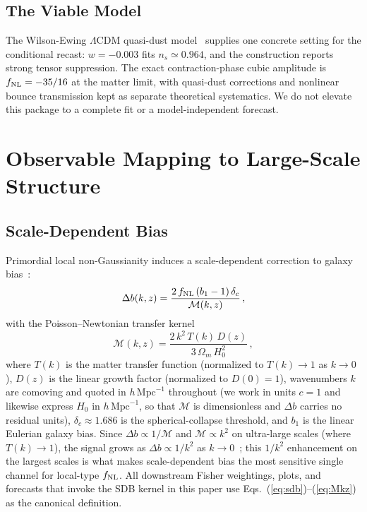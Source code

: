 \documentclass[aps,prd,twocolumn,superscriptaddress,showpacs,preprintnumbers,nofootinbib,longbibliography,floatfix]{revtex4-2}
\newcommand{\fnl}{f_{\rm NL}}
\begin{document}
\subsection{The Viable Model}

The Wilson-Ewing $\Lambda$CDM quasi-dust model~\cite{WilsonEwing:2012} supplies one concrete setting for the conditional recast: $w=-0.003$ fits $n_s\simeq0.964$, and the construction reports strong tensor suppression. The exact contraction-phase cubic amplitude is $\fnl=-35/16$ at the matter limit, with quasi-dust corrections and nonlinear bounce transmission kept as separate theoretical systematics. We do not elevate this package to a complete fit or a model-independent forecast.

\section{Observable Mapping to Large-Scale Structure}
\label{sec:lss}

\subsection{Scale-Dependent Bias}

Primordial local non-Gaussianity induces a scale-dependent correction to galaxy bias~\cite{Dalal:2007cu,Slosar:2008}:
\begin{equation}
\Delta b(k,z) = \frac{2\,\fnl\,(b_1 - 1)\,\delta_c}{\mathcal{M}(k,z)}\,,
\label{eq:sdb}
\end{equation}
with the Poisson--Newtonian transfer kernel
\begin{equation}
\mathcal{M}(k,z) = \frac{2\,k^2\,T(k)\,D(z)}{3\,\Omega_m\,H_0^2}\,,
\label{eq:Mkz}
\end{equation}
where $T(k)$ is the matter transfer function (normalized to $T(k)\to 1$ as $k\to 0$), $D(z)$ is the linear growth factor (normalized to $D(0)=1$), wavenumbers $k$ are comoving and quoted in $h\,\mathrm{Mpc}^{-1}$ throughout (we work in units $c=1$ and likewise express $H_0$ in $h\,\mathrm{Mpc}^{-1}$, so that $\mathcal{M}$ is dimensionless and $\Delta b$ carries no residual units), $\delta_c \approx 1.686$ is the spherical-collapse threshold, and $b_1$ is the linear Eulerian galaxy bias. Since $\Delta b \propto 1/\mathcal{M}$ and $\mathcal{M} \propto k^2$ on ultra-large scales (where $T(k)\to 1$), the signal grows as $\Delta b \propto 1/k^2$ as $k\to 0$~\cite{Dalal:2007cu,Slosar:2008}; this $1/k^2$ enhancement on the largest scales is what makes scale-dependent bias the most sensitive single channel for local-type $\fnl$. All downstream Fisher weightings, plots, and forecasts that invoke the SDB kernel in this paper use Eqs.~(\ref{eq:sdb})--(\ref{eq:Mkz}) as the canonical definition.
\end{document}
